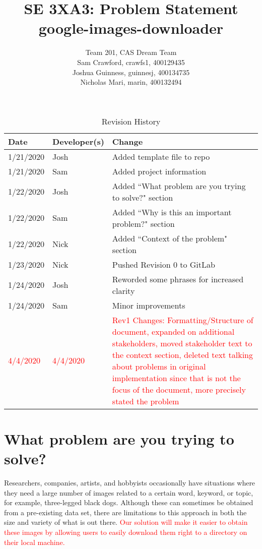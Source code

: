 \documentclass{article}
\title{SE 3XA3: Problem Statement\\google-images-downloader}
\author{Team 201, CAS Dream Team
		\\ Sam Crawford, crawfs1, 400129435
		\\ Joshua Guinness, guinnesj, 400134735
		\\ Nicholas Mari, marin, 400132494
}
\date{}
\begin{document}
\maketitle

\begin{table}
	\caption{Revision History} \label{TblRevisionHistory}
	\begin{tabularx}{\textwidth}{llX}
	\toprule
	\textbf{Date} & \textbf{Developer(s)} & \textbf{Change}\\
	\midrule
	1/21/2020 & Josh & Added template file to repo\\
	1/21/2020 & Sam  & Added project information\\
	1/22/2020 & Josh & Added ``What problem are you trying to solve?" section\\
	1/22/2020 & Sam  & Added ``Why is this an important problem?" section\\
	1/22/2020 & Nick & Added ``Context of the problem" section\\
	1/23/2020 & Nick & Pushed Revision 0 to GitLab\\
	1/24/2020 & Josh & Reworded some phrases for increased clarity\\
	1/24/2020 & Sam  & Minor improvements\\
	\textcolor{red}{4/4/2020} & \textcolor{red}{4/4/2020} & 
	\textcolor{red}{Rev1 Changes: Formatting/Structure of document,
	expanded on additional stakeholders, 
	moved stakeholder text to the context section,
	deleted text talking about problems in original implementation
	since that is not the focus of the document, more precisely stated the problem}\\
	\bottomrule
	\end{tabularx}
\end{table}

\newpage

\section* {What problem are you trying to solve?}


Researchers, companies, artists, and hobbyists occasionally have situations where they need a large number of 
images related to a certain word, keyword, or topic, for example, three-legged black dogs. Although these can 
sometimes be obtained from a pre-existing data set, there are limitations to this approach in both the size 
and variety of what is out there. \textcolor{red}{Our solution will make it easier to obtain these images by
allowing users to easily download them right to a directory on their local machine.}
\end{document}

